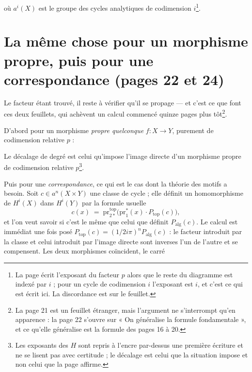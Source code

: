 \documentclass[11pt,a4paper]{article}
\begin{document}
où $a^{i}(X)$ est le groupe des cycles analytiques de codimension
$i$\footnote{La page écrit l'exposant du facteur $p$ alors que le reste du
diagramme est indexé par $i$ ; pour un cycle de codimension $i$ l'exposant est
$i$, et c'est ce qui est écrit ici. La discordance est sur le feuillet.}.

\section*{La même chose pour un morphisme propre, puis pour une correspondance (pages 22 et 24)}

Le facteur étant trouvé, il reste à vérifier qu'il se propage — et c'est ce que
font ces deux feuillets, qui achèvent un calcul commencé quinze pages plus
tôt\footnote{La page 21 est un feuillet étranger, mais l'argument ne s'interrompt
qu'en apparence : la page 22 s'ouvre sur « On généralise la formule
fondamentale », et ce qu'elle généralise est la formule des pages 16 à 20.}.

D'abord pour un morphisme \emph{propre quelconque} $f \colon X \to Y$, purement
de codimension relative $p$ :


Le décalage de degré est celui qu'impose l'image directe d'un morphisme propre
de codimension relative $p$\footnote{Les exposants des $H$ sont repris à l'encre
par-dessus une première écriture et ne se lisent pas avec certitude ; le
décalage est celui que la situation impose et non celui que la page affirme.}.

Puis pour une \emph{correspondance}, ce qui est le cas dont la théorie des
motifs a besoin. Soit $c \in a^{n}(X \times Y)$ une classe de cycle ; elle
définit un homomorphisme de $H^{i}(X)$ dans $H^{i}(Y)$ par la formule usuelle
\[
  c(x) \;=\; \mathrm{pr}^{\mathrm{top}}_{2*}\bigl(\mathrm{pr}^{*}_{1}(x) \cdot
  P_{\mathrm{top}}(c)\bigr) ,
\]
et l'on veut savoir si c'est le même que celui que définit
$P_{\mathrm{alg}}(c)$. Le calcul est immédiat une fois posé
$P_{\mathrm{top}}(c) = (1/2i\pi)^{n} P_{\mathrm{alg}}(c)$ : le facteur introduit
par la classe et celui introduit par l'image directe sont inverses l'un de
l'autre et se compensent. Les deux morphismes coïncident, le carré
\end{document}
